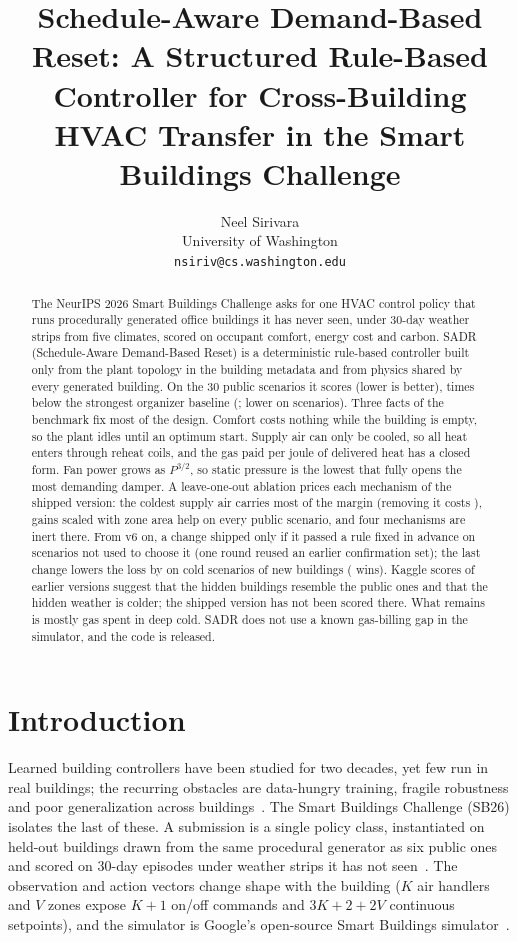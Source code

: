 \documentclass{article}
\title{Schedule-Aware Demand-Based Reset: A Structured Rule-Based Controller for Cross-Building HVAC Transfer in the Smart Buildings Challenge}
\author{%
  Neel Sirivara\\
  University of Washington\\
  \texttt{nsiriv@cs.washington.edu}
}
\begin{document}
\maketitle

\begin{abstract}
The NeurIPS 2026 Smart Buildings Challenge asks for one HVAC control policy that runs procedurally generated office buildings it has never seen, under 30-day weather strips from five climates, scored on occupant comfort, energy cost and carbon. SADR (Schedule-Aware Demand-Based Reset) is a deterministic rule-based controller built only from the plant topology in the building metadata and from physics shared by every generated building. On the 30 public scenarios it scores \RTenConfPubCand{} (lower is better), \RElvPwTimes{} times below the strongest organizer baseline (\MetricPidWater; lower on \RElvPwWins{} scenarios). Three facts of the benchmark fix most of the design. Comfort costs nothing while the building is empty, so the plant idles until an optimum start. Supply air can only be cooled, so all heat enters through reheat coils, and the gas paid per joule of delivered heat has a closed form. Fan power grows as $P^{3/2}$, so static pressure is the lowest that fully opens the most demanding damper. A leave-one-out ablation prices each mechanism of the shipped version: the coldest supply air carries most of the margin (removing it costs \RElvAbSatRel), gains scaled with zone area help on every public scenario, and four mechanisms are inert there. From v6 on, a change shipped only if it passed a rule fixed in advance on scenarios not used to choose it (one round reused an earlier confirmation set); the last change lowers the loss by \RTenConfHarshCThreeRelAbs{} on \RTenConfHarshCThreeN{} cold scenarios of \RTenNNewBuild{} new buildings (\RTenConfHarshCThreeWins{} wins). Kaggle scores of earlier versions suggest that the hidden buildings resemble the public ones and that the hidden weather is colder; the shipped version has not been scored there. What remains is mostly gas spent in deep cold. SADR does not use a known gas-billing gap in the simulator, and the code is released.
\end{abstract}

\section{Introduction}

Learned building controllers have been studied for two decades, yet few run in real buildings; the recurring obstacles are data-hungry training, fragile robustness and poor generalization across buildings~\citep{wang2020rl}. The Smart Buildings Challenge (SB26) isolates the last of these. A submission is a single policy class, instantiated on held-out buildings drawn from the same procedural generator as six public ones and scored on 30-day episodes under weather strips it has not seen~\citep{sb26kit}. The observation and action vectors change shape with the building ($K$ air handlers and $V$ zones expose $K{+}1$ on/off commands and $3K{+}2{+}2V$ continuous setpoints), and the simulator is Google's open-source Smart Buildings simulator~\citep{goldfeder2023lightweight,goldfeder2025suite}.
\end{document}
